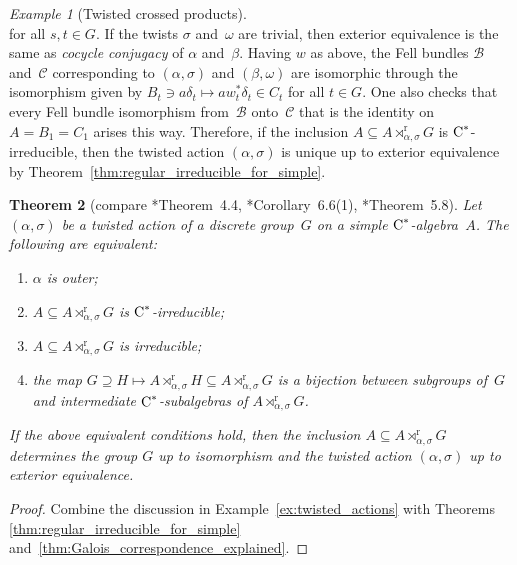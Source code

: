 \documentclass[a4paper]{amsart}
\theoremstyle{plain}
\newtheorem{theorem}{Theorem}
\theoremstyle{definition}
\theoremstyle{remark}
\newtheorem{example}[theorem]{Example}
\numberwithin{theorem}{section}
\numberwithin{equation}{section}
\newcommand*{\nb}{\nobreakdash}
\newcommand*{\red}{\mathrm{r}}%
\newcommand*{\Cst}{\textup C^*}%
\newcommand*{\B}{\mathcal B}%
\begin{document}
\begin{example}[Twisted crossed products]
\[  \]
  for all \(s,t\in G\).  If the twists \(\sigma\) and~\(\omega\) are trivial, then exterior
  equivalence is the same as \emph{cocycle conjugacy} of \(\alpha\)
  and~\(\beta\). Having   \(w\) as above,
   the Fell bundles \(\B\) and~\(\mathcal{C}\) corresponding to
  \((\alpha,\sigma)\) and \((\beta,\omega)\) are isomorphic through
  the isomorphism given by \(B_t\ni a\delta_t\mapsto a
  w_t^*\delta_t\in C_t\) for all \(t\in G\).
  One also checks that every Fell bundle isomorphism from~\(\B\)
  onto~\(\mathcal{C}\) that is the identity on \(A=B_1=C_1\) arises
  this way.
  Therefore, if the inclusion \( A\subseteq
  A\rtimes^\red_{\alpha,\sigma} G\) is \(\Cst\)\nb-irreducible, then
  the twisted action \((\alpha,\sigma)\) is unique up to exterior
  equivalence by Theorem~\ref{thm:regular_irreducible_for_simple}.
\end{example}

\begin{theorem}[compare \cite{Cameron-Smith:Galois_reduced}*{Theorem~4.4},
  \cite{Izumi:Inclusions_simple}*{Corollary~6.6(1)},
  \cite{Rordam:Irreducible_inclusions}*{Theorem~5.8}]
  \label{cor:Cameron-Smith}
  Let \((\alpha,\sigma)\) be a twisted action of a discrete
  group~\(G\) on a simple \(\Cst\)\nb-algebra~\(A\).
  The following are equivalent:
  \begin{enumerate}
  \item \(\alpha\) is outer;
  \item \(A\subseteq A\rtimes^\red_{\alpha,\sigma} G\) is \(\Cst\)\nb-irreducible;
  \item \(A\subseteq A\rtimes^\red_{\alpha,\sigma} G\) is irreducible;
  \item the map
    \(G\supseteq H \mapsto A\rtimes^\red_{\alpha,\sigma} H\subseteq
    A\rtimes^\red_{\alpha,\sigma} G\) is a bijection between subgroups
    of~\(G\) and intermediate \(\Cst\)\nb-subalgebras of
    \(A\rtimes^\red_{\alpha,\sigma} G\).
  \end{enumerate}
  If the above equivalent conditions hold, then the inclusion
  \(A\subseteq A\rtimes^\red_{\alpha,\sigma} G\) determines the group \(G\) up to isomorphism
 and the twisted action \((\alpha,\sigma)\) up to exterior equivalence.
\end{theorem}

\begin{proof}
  Combine the discussion in Example~\ref{ex:twisted_actions} with
  Theorems \ref{thm:regular_irreducible_for_simple}
  and~\ref{thm:Galois_correspondence_explained}.
\end{proof}
\end{document}
